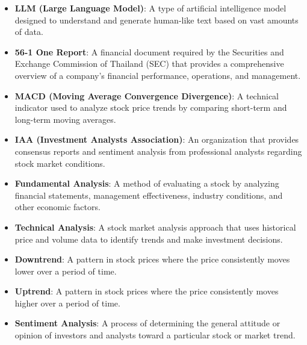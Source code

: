 \begin{itemize}
    \item \textbf{LLM (Large Language Model)}: A type of artificial intelligence model designed to understand and generate human-like text based on vast amounts of data.
    \item \textbf{56-1 One Report}: A financial document required by the Securities and Exchange Commission of Thailand (SEC) that provides a comprehensive overview of a company's financial performance, operations, and management.
    \item \textbf{MACD (Moving Average Convergence Divergence)}: A technical indicator used to analyze stock price trends by comparing short-term and long-term moving averages.
    \item \textbf{IAA (Investment Analysts Association)}: An organization that provides consensus reports and sentiment analysis from professional analysts regarding stock market conditions.
    \item \textbf{Fundamental Analysis}: A method of evaluating a stock by analyzing financial statements, management effectiveness, industry conditions, and other economic factors.
    \item \textbf{Technical Analysis}: A stock market analysis approach that uses historical price and volume data to identify trends and make investment decisions.
    \item \textbf{Downtrend}: A pattern in stock prices where the price consistently moves lower over a period of time.
    \item \textbf{Uptrend}: A pattern in stock prices where the price consistently moves higher over a period of time.
    \item \textbf{Sentiment Analysis}: A process of determining the general attitude or opinion of investors and analysts toward a particular stock or market trend.
\end{itemize}
